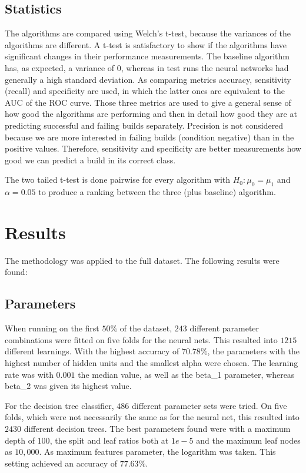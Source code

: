 \documentclass[a4paper,11pt]{article}
\begin{document}
\subsection{Statistics}

The algorithms are compared using Welch's t-test, because the variances of the algorithms are different. A t-test is satisfactory to show if the algorithms have significant changes in their performance measurements. The baseline algorithm has, as expected, a variance of 0, whereas in test runs the neural networks had generally a high standard deviation. As comparing metrics accuracy, sensitivity (recall) and specificity are used, in which the latter ones are equivalent to the AUC of the ROC curve. Those three metrics are used to give a general sense of how good the algorithms are performing and then in detail how good they are at predicting successful and failing builds separately. Precision is not considered because we are more interested in failing builds (condition negative) than in the positive values. Therefore, sensitivity and specificity are better measurements how good we can predict a build in its correct class.

The two tailed t-test is done pairwise for every algorithm with  $H_0 : \mu_0 = \mu_1$ and $\alpha=0.05$ to produce a ranking between the three (plus baseline) algorithm. 


\section{Results}

The methodology was applied to the full dataset. The following results were found:

\subsection{Parameters}

When running on the first $50\%$ of the dataset, $243$ different parameter combinations were fitted on five folds for the neural nets. This resulted into $1215$ different learnings. With the highest accuracy of $70.78\%$, the parameters with the highest number of hidden units and the smallest alpha were chosen. The learning rate was with $0.001$ the median value, as well as the  beta\_1 parameter, whereas beta\_2 was given its highest value. 

For the decision tree classifier, $486$ different parameter sets were tried. On five folds, which were not necessarily the same as for the neural net, this resulted into $2430$ different decision trees.
The best parameters found were with a maximum depth of $100$, the split and leaf ratios both at $1e-5$ and the maximum leaf nodes as $10,000$. As maximum features parameter, the logarithm was taken. This setting achieved an accuracy of $77.63\%$. 
\end{document}
